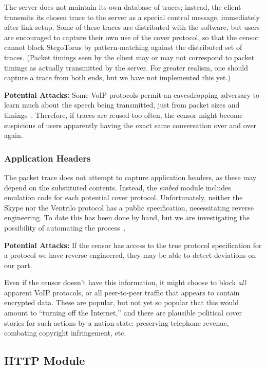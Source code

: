 The server does not maintain its own database of traces; instead, the
client transmits its chosen trace to the server as a special control
message, immediately after link setup.  Some of these traces are
distributed with the software, but users are encouraged to capture
their own use of the cover protocol, so that the censor cannot block
StegoTorus by pattern-matching against the distributed set of traces.
(Packet timings seen by the client may or may not correspond to packet
timings as actually transmitted by the server.  For greater realism,
one should capture a trace from both ends, but we have not implemented
this yet.)

\smallskip\noindent\textbf{Potential Attacks:} Some VoIP protocols
permit an eavesdropping adversary to learn much about the speech being
transmitted, just from packet sizes and timings~\cite{a-foniks}.
Therefore, if traces are reused too often, the censor might become
suspicious of users apparently having the exact same conversation over
and over again.

\subsubsection{Application Headers}

The packet trace does not attempt to capture application headers, as
these may depend on the substituted contents.  Instead, the
\emph{embed} module includes emulation code for each potential cover
protocol.  Unfortunately, neither the Skype nor the Ventrilo protocol
has a public specification, necessitating reverse engineering.  To
date this has been done by hand, but we are investigating the
possibility of automating the
process~\cite{a-polyglot,a-discoverer,a-ctxtaware}.

\smallskip\noindent\textbf{Potential Attacks:} If the censor has
access to the true protocol specification for a protocol we have
reverse engineered, they may be able to detect deviations on our
part.

Even if the censor doesn't have this information, it might choose to
block \emph{all} apparent VoIP protocols, or all peer-to-peer traffic
that appears to contain encrypted data.  These are popular, but not
yet so popular that this would amount to “turning off the Internet,”
and there are plausible political cover stories for such actions by a
nation-state: preserving telephone revenue, combating copyright
infringement, etc.

\subsection{HTTP Module}


